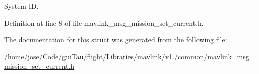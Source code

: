 System I\-D. 



Definition at line 8 of file mavlink\-\_\-msg\-\_\-mission\-\_\-set\-\_\-current.\-h.



The documentation for this struct was generated from the following file\-:\begin{DoxyCompactItemize}
\item 
/home/jose/\-Code/gui\-Tau/flight/\-Libraries/mavlink/v1./common/\hyperlink{mavlink__msg__mission__set__current_8h}{mavlink\-\_\-msg\-\_\-mission\-\_\-set\-\_\-current.\-h}\end{DoxyCompactItemize}
